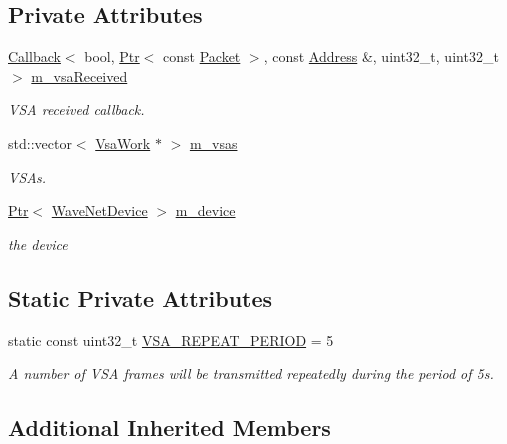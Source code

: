 \subsection*{Private Attributes}
\begin{DoxyCompactItemize}
\item 
\hyperlink{classns3_1_1Callback}{Callback}$<$ bool, \hyperlink{classns3_1_1Ptr}{Ptr}$<$ const \hyperlink{classns3_1_1Packet}{Packet} $>$, const \hyperlink{classns3_1_1Address}{Address} \&, uint32\+\_\+t, uint32\+\_\+t $>$ \hyperlink{classns3_1_1VsaManager_aeccc82895aa122c2625aaf564987034b}{m\+\_\+vsa\+Received}
\begin{DoxyCompactList}\small\item\em V\+SA received callback. \end{DoxyCompactList}\item 
std\+::vector$<$ \hyperlink{structns3_1_1VsaManager_1_1VsaWork}{Vsa\+Work} $\ast$ $>$ \hyperlink{classns3_1_1VsaManager_aee890e87ec25f92c31c8afd8666f3031}{m\+\_\+vsas}
\begin{DoxyCompactList}\small\item\em V\+S\+As. \end{DoxyCompactList}\item 
\hyperlink{classns3_1_1Ptr}{Ptr}$<$ \hyperlink{classns3_1_1WaveNetDevice}{Wave\+Net\+Device} $>$ \hyperlink{classns3_1_1VsaManager_a52ae414f7b31a4d8b9c572689b7a7108}{m\+\_\+device}
\begin{DoxyCompactList}\small\item\em the device \end{DoxyCompactList}\end{DoxyCompactItemize}
\subsection*{Static Private Attributes}
\begin{DoxyCompactItemize}
\item 
static const uint32\+\_\+t \hyperlink{classns3_1_1VsaManager_a552deee2b7263756fad4f3e95f4ef777}{V\+S\+A\+\_\+\+R\+E\+P\+E\+A\+T\+\_\+\+P\+E\+R\+I\+OD} = 5
\begin{DoxyCompactList}\small\item\em A number of V\+SA frames will be transmitted repeatedly during the period of 5s. \end{DoxyCompactList}\end{DoxyCompactItemize}
\subsection*{Additional Inherited Members}


